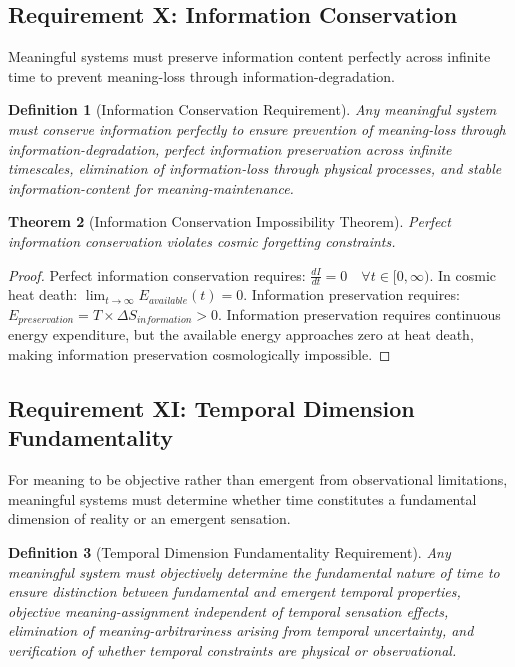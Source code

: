\documentclass[12pt,a4paper]{article}
\newtheorem{theorem}{Theorem}[section]
\newtheorem{definition}[theorem]{Definition}
\begin{document}
\subsection{Requirement X: Information Conservation}

Meaningful systems must preserve information content perfectly across infinite time to prevent meaning-loss through information-degradation.

\begin{definition}[Information Conservation Requirement]
Any meaningful system must conserve information perfectly to ensure prevention of meaning-loss through information-degradation, perfect information preservation across infinite timescales, elimination of information-loss through physical processes, and stable information-content for meaning-maintenance.
\end{definition}

\begin{theorem}[Information Conservation Impossibility Theorem]
Perfect information conservation violates cosmic forgetting constraints.
\end{theorem}

\begin{proof}
Perfect information conservation requires: $\frac{dI}{dt} = 0 \quad \forall t \in [0,\infty)$. In cosmic heat death: $\lim_{t \to \infty} E_{available}(t) = 0$. Information preservation requires: $E_{preservation} = T \times \Delta S_{information} > 0$. Information preservation requires continuous energy expenditure, but the available energy approaches zero at heat death, making information preservation cosmologically impossible.
\end{proof}

\subsection{Requirement XI: Temporal Dimension Fundamentality}

For meaning to be objective rather than emergent from observational limitations, meaningful systems must determine whether time constitutes a fundamental dimension of reality or an emergent sensation.

\begin{definition}[Temporal Dimension Fundamentality Requirement]
Any meaningful system must objectively determine the fundamental nature of time to ensure distinction between fundamental and emergent temporal properties, objective meaning-assignment independent of temporal sensation effects, elimination of meaning-arbitrariness arising from temporal uncertainty, and verification of whether temporal constraints are physical or observational.
\end{definition}
\end{document}
